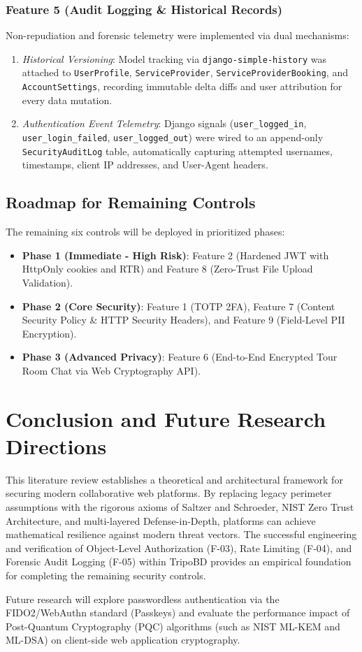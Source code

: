 \documentclass[10pt,twocolumn,a4paper]{article}
\begin{document}
\subsubsection{Feature 5 (Audit Logging \& Historical Records)}
Non-repudiation and forensic telemetry were implemented via dual mechanisms:
\begin{enumerate}[leftmargin=*]
    \item \textit{Historical Versioning}: Model tracking via \texttt{django-simple-history} was attached to \texttt{UserProfile}, \texttt{ServiceProvider}, \texttt{ServiceProviderBooking}, and \texttt{AccountSettings}, recording immutable delta diffs and user attribution for every data mutation.
    \item \textit{Authentication Event Telemetry}: Django signals (\texttt{user\_logged\_in}, \texttt{user\_login\_failed}, \texttt{user\_logged\_out}) were wired to an append-only \texttt{SecurityAuditLog} table, automatically capturing attempted usernames, timestamps, client IP addresses, and User-Agent headers.
\end{enumerate}

\subsection{Roadmap for Remaining Controls}
The remaining six controls will be deployed in prioritized phases:
\begin{itemize}[leftmargin=*]
    \item \textbf{Phase 1 (Immediate - High Risk)}: Feature 2 (Hardened JWT with HttpOnly cookies and RTR) and Feature 8 (Zero-Trust File Upload Validation).
    \item \textbf{Phase 2 (Core Security)}: Feature 1 (TOTP 2FA), Feature 7 (Content Security Policy \& HTTP Security Headers), and Feature 9 (Field-Level PII Encryption).
    \item \textbf{Phase 3 (Advanced Privacy)}: Feature 6 (End-to-End Encrypted Tour Room Chat via Web Cryptography API).
\end{itemize}

\section{Conclusion and Future Research Directions}
This literature review establishes a theoretical and architectural framework for securing modern collaborative web platforms. By replacing legacy perimeter assumptions with the rigorous axioms of Saltzer and Schroeder, NIST Zero Trust Architecture, and multi-layered Defense-in-Depth, platforms can achieve mathematical resilience against modern threat vectors. The successful engineering and verification of Object-Level Authorization (F-03), Rate Limiting (F-04), and Forensic Audit Logging (F-05) within TripoBD provides an empirical foundation for completing the remaining security controls.

Future research will explore passwordless authentication via the FIDO2/WebAuthn standard (Passkeys) and evaluate the performance impact of Post-Quantum Cryptography (PQC) algorithms (such as NIST ML-KEM and ML-DSA) on client-side web application cryptography.



\end{document}
